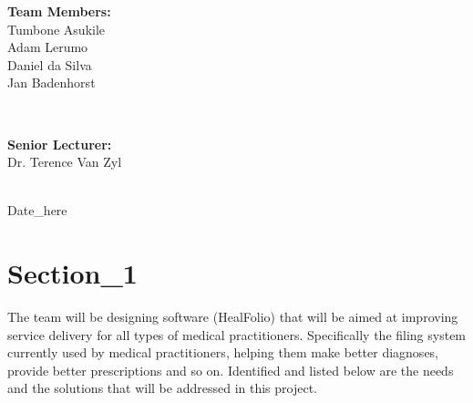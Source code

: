 \documentclass[a4paper]{article}
\begin{document}
\begin{titlepage}
\begin{minipage}{0.4\textwidth}
\begin{flushleft}
\textbf{Team Members:} \\[0.3cm]

Tumbone Asukile \\
Adam Lerumo \\
Daniel da Silva \\
Jan Badenhorst \\

\end{flushleft}

\end{minipage} \\[0.7cm]

\begin{minipage}{0.4\textwidth}

\begin{flushright} \large

\textbf{Senior Lecturer:} \\[0.3cm]

Dr. Terence Van Zyl

\end{flushright}

\end{minipage} \\[1cm]

{\large Date\_here} 
    
\end{titlepage}

\setlength\parindent{24pt}

\newpage
\section*{Section\_1}
	The team will be designing software (HealFolio) that will be aimed at improving service delivery for all types of medical practitioners. Specifically the filing system currently used by medical practitioners, helping them make better diagnoses, provide better prescriptions and so on. Identified and listed below are the needs and the solutions that will be addressed in this project.

\newpage
\end{document}
